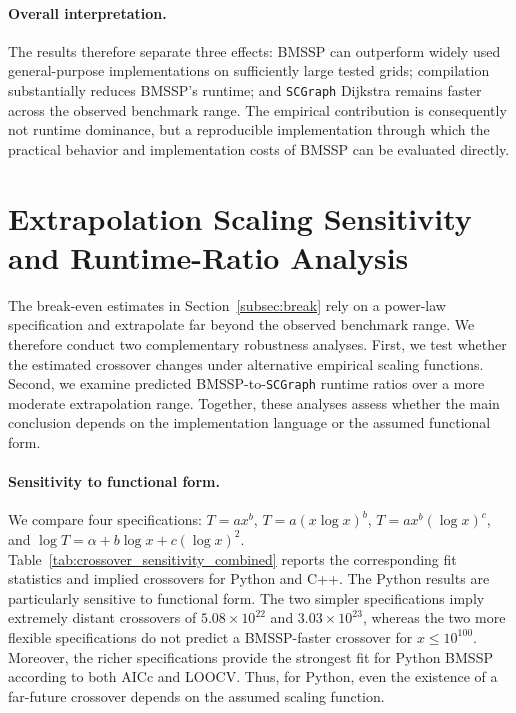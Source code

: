 \documentclass[ijoc,blindrev]{informs3} %
\begin{document}
\begin{APPENDICES}
{\paragraph{Overall interpretation.} The results therefore separate three effects: BMSSP can outperform widely used general-purpose implementations on sufficiently large tested grids; compilation substantially reduces BMSSP's runtime; and \texttt{SCGraph} Dijkstra remains faster across the observed benchmark range. The empirical contribution is consequently not runtime dominance, but a reproducible implementation through which the practical behavior and implementation costs of BMSSP can be evaluated directly.


\section{Extrapolation Scaling Sensitivity and Runtime-Ratio Analysis}
\label{app:runtime_ratio}

The break-even estimates in Section~\ref{subsec:break} rely on a power-law specification and extrapolate far beyond the observed benchmark range. We therefore conduct two complementary robustness analyses. First, we test whether the estimated crossover changes under alternative empirical scaling functions. Second, we examine predicted BMSSP-to-\texttt{SCGraph} runtime ratios over a more moderate extrapolation range. Together, these analyses assess whether the main conclusion depends on the implementation language or the assumed functional form.

\paragraph{Sensitivity to functional form.}
We compare four specifications: \(T=ax^b\), \(T=a(x\log x)^b\), \(T=ax^b(\log x)^c\), and \(\log T=\alpha+b\log x+c(\log x)^2\). Table~\ref{tab:crossover_sensitivity_combined} reports the corresponding fit statistics and implied crossovers for Python and C++. The Python results are particularly sensitive to functional form. The two simpler specifications imply extremely distant crossovers of \(5.08\times10^{22}\) and \(3.03\times10^{23}\), whereas the two more flexible specifications do not predict a BMSSP-faster crossover for \(x\leq10^{100}\). Moreover, the richer specifications provide the strongest fit for Python BMSSP according to both AICc and LOOCV. Thus, for Python, even the existence of a far-future crossover depends on the assumed scaling function.

}
\end{APPENDICES}
\end{document}

